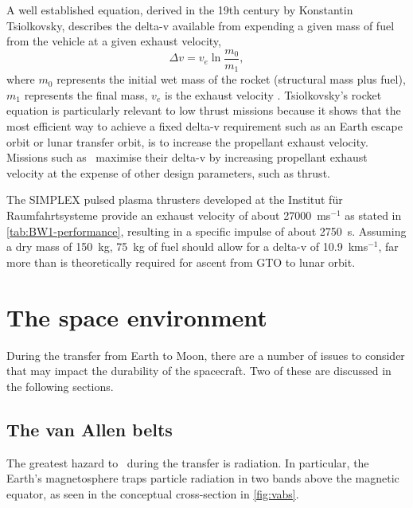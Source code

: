 A well established equation, derived in the 19th century by Konstantin Tsiolkovsky, describes the delta-v available from expending a given mass of fuel from the vehicle at a given exhaust velocity,
\begin{equation}\label{eq:Tsiolkovsky}
\Delta v=v_{e}\ln\frac{m_{0}}{m_{1}},
\end{equation}
where $m_{0}$ represents the initial wet mass of the rocket (structural mass plus fuel), $m_{1}$ represents the final mass, $v_{e}$ is the exhaust velocity \parencite{Tsiolkovsky1903,Chobotov2002}. Tsiolkovsky's rocket equation is particularly relevant to low thrust missions because it shows that the most efficient way to achieve a fixed delta-v requirement such as an Earth escape orbit or lunar transfer orbit, is to increase the propellant exhaust velocity. Missions such as \BW\ maximise their delta-v by increasing propellant exhaust velocity at the expense of other design parameters, such as thrust.

The SIMPLEX pulsed plasma thrusters developed at the Institut f\"{u}r Raumfahrtsysteme \parencite{Nawaz2008} provide an exhaust velocity of about 27000~ms$^{-1}$ as stated in \autoref{tab:BW1-performance}, resulting in a specific impulse of about 2750~s. Assuming a dry mass of 150~kg, 75~kg of fuel should allow for a delta-v of 10.9~kms$^{-1}$, far more than is theoretically required for ascent from GTO to lunar orbit.




\section{The space environment} \label{sec:Environment}

During the transfer from Earth to Moon, there are a number of issues to consider that may impact the durability of the spacecraft. Two of these are discussed in the following sections.

\subsection{The van Allen belts} \label{sub:VABs}

The greatest hazard to \BW\ during the transfer is radiation. In particular, the Earth's magnetosphere traps particle radiation in two bands above the magnetic equator, as seen in the conceptual cross-section in \autoref{fig:vabs}. 

